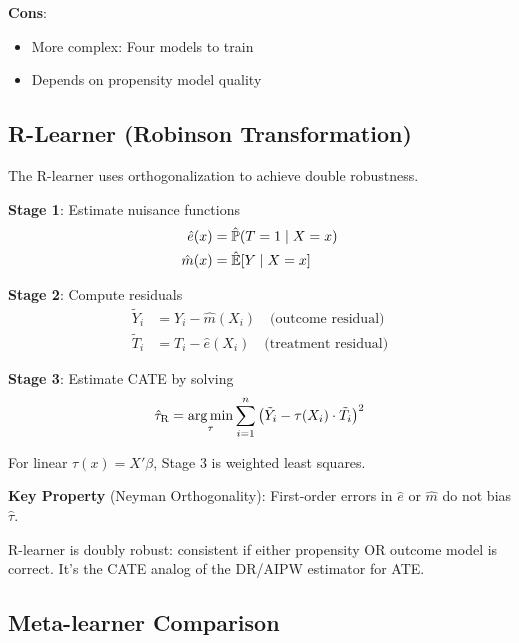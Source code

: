 \textbf{Cons}:
\begin{itemize}
    \item More complex: Four models to train
    \item Depends on propensity model quality
\end{itemize}

\subsection{R-Learner (Robinson Transformation)}

The R-learner uses orthogonalization to achieve double robustness.

\begin{definition}
\label{def:rlearner}

\textbf{Stage 1}: Estimate nuisance functions
\begin{align}
\hat{e}(x) &= \hat{\mathbb{P}}(T=1 \mid X=x) \\
\hat{m}(x) &= \hat{\mathbb{E}}[Y \mid X=x]
\end{align}

\textbf{Stage 2}: Compute residuals
\begin{align}
\tilde{Y}_i &= Y_i - \hat{m}(X_i) \quad \text{(outcome residual)} \\
\tilde{T}_i &= T_i - \hat{e}(X_i) \quad \text{(treatment residual)}
\end{align}

\textbf{Stage 3}: Estimate CATE by solving
\begin{equation}
\hat{\tau}_{\text{R}} = \operatorname*{arg\,min}_{\tau} \sum_{i=1}^{n} \left( \tilde{Y}_i - \tau(X_i) \cdot \tilde{T}_i \right)^2
\end{equation}
\end{definition}

For linear $\tau(x) = X'\beta$, Stage 3 is weighted least squares.

\textbf{Key Property} (Neyman Orthogonality): First-order errors in $\hat{e}$ or $\hat{m}$ do not bias $\hat{\tau}$.

\begin{insight}
R-learner is doubly robust: consistent if either propensity OR outcome model is correct. It's the CATE analog of the DR/AIPW estimator for ATE.
\end{insight}

\subsection{Meta-learner Comparison}

